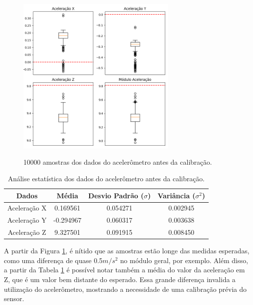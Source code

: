 \documentclass[acronym, symbols, table, deposito]{fei}
\begin{document}
	\begin{figure}[!htb]
		\centering
		\caption{10000 amostras dos dados do acelerômetro antes da calibração.}
		\includegraphics[width=0.7\textwidth]{dados_acelerometro_errados.png}
		\label{fig:dados_acelerometro_errado}
	\end{figure}
	
	\begin{table}[!htb]
		\centering
		\caption{Análise estatística dos dados do acelerômetro antes da calibração.}\label{tab:acelerometro_antes_calibracao}
		\begin{tabular}{|c|c|c|c|}
			\hline
			Dados & Média & Desvio Padrão ($\sigma$) & Variância ($\sigma^2$) \\ \hline
			\small Aceleração X & 0.169561  & 0.054271 & 0.002945 \\ \hline
			\small Aceleração Y & -0.294967 & 0.060317 & 0.003638 \\ \hline
			\small Aceleração Z & 9.327501  & 0.091915 & 0.008450 \\ \hline			
		\end{tabular}
	\end{table}
	
	A partir da Figura \ref{fig:dados_acelerometro_errado}, é nítido que as amostras estão longe das medidas esperadas, como uma diferença de quase 0.5$m/s^2$ no módulo geral, por exemplo. Além disso, a partir da Tabela \ref{tab:acelerometro_antes_calibracao} é possível notar também a média do valor da aceleração em Z, que é um valor bem distante do esperado. Essa grande diferença invalida a utilização do acelerômetro, mostrando a necessidade de uma calibração prévia do sensor.
	
\end{document}

